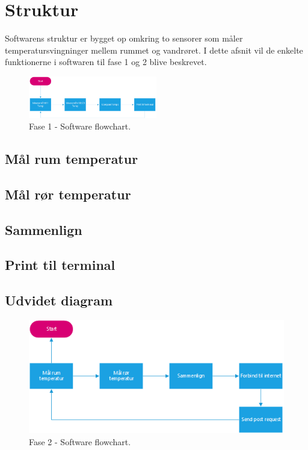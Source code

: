 \section{Struktur}
Softwarens struktur er bygget op omkring to sensorer som måler temperatursvingninger mellem rummet og vandrøret. I dette afsnit vil de enkelte funktionerne i softwaren til fase 1 og 2 blive beskrevet. 
\begin{figure}[h!]
  \centering
  \includegraphics[width=0.5\textwidth]{figures/Fase1software2.png}
  \caption{Fase 1 - Software flowchart.}
\end{figure}


\subsection{Mål rum temperatur}
\subsection{Mål rør temperatur}
\subsection{Sammenlign}
\subsection{Print til terminal}

\subsection{Udvidet diagram}
\begin{figure}[h!]
  \centering
  \includegraphics[width=1\textwidth]{figures/Fase2software.png}
  \caption{Fase 2 - Software flowchart.}
\end{figure}